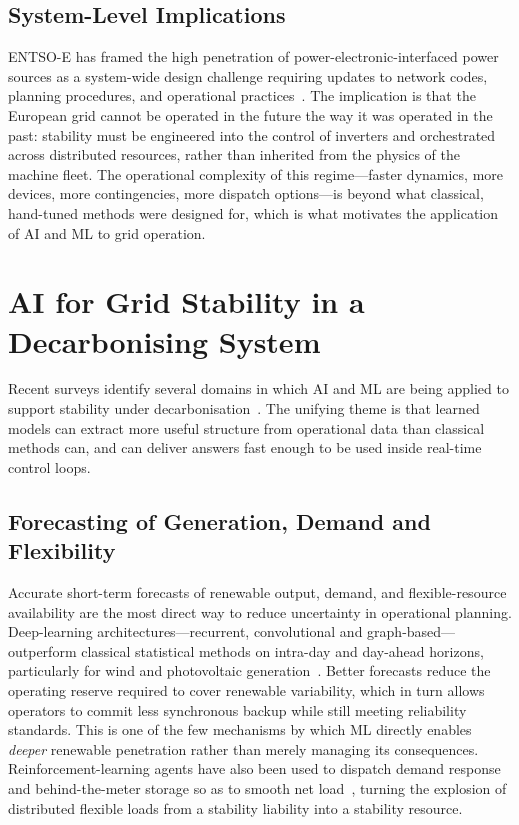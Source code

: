 \documentclass[conference]{IEEEtran}
\begin{document}
\subsection{System-Level Implications}
ENTSO-E has framed the high penetration of power-electronic-interfaced power sources as a system-wide design challenge requiring updates to network codes, planning procedures, and operational practices~\cite{entsoe2017hpopeips}. The implication is that the European grid cannot be operated in the future the way it was operated in the past: stability must be engineered into the control of inverters and orchestrated across distributed resources, rather than inherited from the physics of the machine fleet. The operational complexity of this regime---faster dynamics, more devices, more contingencies, more dispatch options---is beyond what classical, hand-tuned methods were designed for, which is what motivates the application of AI and ML to grid operation.

\section{AI for Grid Stability in a Decarbonising System}\label{sec:ai}
Recent surveys identify several domains in which AI and ML are being applied to support stability under decarbonisation~\cite{duchesne2020ml,ahmad2021ai}. The unifying theme is that learned models can extract more useful structure from operational data than classical methods can, and can deliver answers fast enough to be used inside real-time control loops.

\subsection{Forecasting of Generation, Demand and Flexibility}
Accurate short-term forecasts of renewable output, demand, and flexible-resource availability are the most direct way to reduce uncertainty in operational planning. Deep-learning architectures---recurrent, convolutional and graph-based---outperform classical statistical methods on intra-day and day-ahead horizons, particularly for wind and photovoltaic generation~\cite{ahmad2021ai}. Better forecasts reduce the operating reserve required to cover renewable variability, which in turn allows operators to commit less synchronous backup while still meeting reliability standards. This is one of the few mechanisms by which ML directly enables \emph{deeper} renewable penetration rather than merely managing its consequences. Reinforcement-learning agents have also been used to dispatch demand response and behind-the-meter storage so as to smooth net load~\cite{vazquez2019rl}, turning the explosion of distributed flexible loads from a stability liability into a stability resource.
\end{document}
